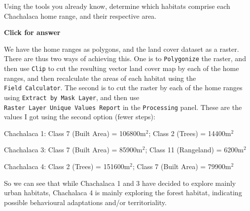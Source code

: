 \documentclass[
  letterpaper,
  DIV=11,
  numbers=noendperiod]{scrreprt}
\begin{document}
\begin{tcolorbox}[enhanced jigsaw, breakable, toptitle=1mm, colback=white, left=2mm, leftrule=.75mm, titlerule=0mm, colframe=quarto-callout-important-color-frame, opacityback=0, title=\textcolor{quarto-callout-important-color}{\faExclamation}\hspace{0.5em}{Stop and Think}, toprule=.15mm, opacitybacktitle=0.6, bottomtitle=1mm, colbacktitle=quarto-callout-important-color!10!white, bottomrule=.15mm, coltitle=black, rightrule=.15mm, arc=.35mm]

Using the tools you already know, determine which habitats comprise each
Chachalaca home range, and their respective area.

\end{tcolorbox}

\begin{tcolorbox}[enhanced jigsaw, leftrule=.75mm, colframe=quarto-callout-important-color-frame, breakable, toprule=.15mm, bottomrule=.15mm, arc=.35mm, rightrule=.15mm, opacityback=0, colback=white, left=2mm]

\vspace{-3mm}\textbf{Click for answer}\vspace{3mm}

We have the home ranges as polygons, and the land cover dataset as a
raster. There are thus two ways of achieving this. One is to
\texttt{Polygonize} the raster, and then use \texttt{Clip} to cut the
resulting vector land cover map by each of the home ranges, and then
recalculate the areas of each habitat using the
\texttt{Field\ Calculator}. The second is to cut the raster by each of
the home ranges using \texttt{Extract\ by\ Mask\ Layer}, and then use
\texttt{Raster\ Layer\ Unique\ Values\ Report} in the
\texttt{Processing} panel. These are the values I got using the second
option (fewer steps):

Chachalaca 1: Class 7 (Built Area) = 106800m\(^2\); Class 2 (Trees) =
14400m\(^2\)

Chachalaca 3: Class 7 (Built Area) = 85900m\(^2\); Class 11 (Rangeland)
= 6200m\(^2\)

Chachalaca 4: Class 2 (Trees) = 151600m\(^2\); Class 7 (Built Area) =
79900m\(^2\)

So we can see that while Chachalaca 1 and 3 have decided to explore
mainly urban habitats, Chachalaca 4 is mainly exploring the forest
habitat, indicating possible behavioural adaptations and/or
territoriality.

\end{tcolorbox}
\end{document}
